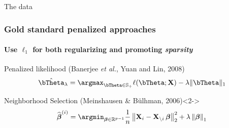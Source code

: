 \documentclass{beamer}\usepackage[]{graphicx}\usepackage[]{color}
\begin{document}
\begin{frame}
\begin{overlayarea}{\textwidth}{\textheight}
{\begin{beamerboxesrounded}[upper=sur:head,lower=sur:bloc,shadow=true]{The data}
      \end{beamerboxesrounded}
    }
  \end{overlayarea}      
\end{frame}

\begin{frame}
  \frametitle{Gold standard penalized approaches}
  \framesubtitle{Use $\ell_1$ for both regularizing and promoting \textit{sparsity}}

  \begin{overlayarea}{\textwidth}{\textheight}

  \begin{block}{Penalized likelihood (Banerjee \textit{et al.}, Yuan and Lin, 2008)}
    \vspace{-1em}
    \begin{equation*}
      \hat{\bTheta}_\lambda=\argmax_{\bTheta \in \mathbb{S}_+}
      \ell(\bTheta;\mathbf{X})-\lambda
      \|\bTheta\|_{1}
    \end{equation*}
  \end{block}
  \vspace*{-1em}


  \vfill

  \begin{block}{Neighborhood Selection (Meinshausen \& B\"ulhman, 2006)}<2->
    \vspace*{-1em}
    \begin{equation*}
      \widehat{\boldsymbol\beta}^{(i)} = \argmin_{\boldsymbol\beta \in \mathbb{R}^{p-1} }
      \frac{1}{n} \left\| \mathbf{X}_i - \mathbf{X}_{\backslash i} \,
        {\boldsymbol\beta} \right\|_2^2 + \lambda \left\| {\boldsymbol\beta} \right\|_{1}
    \end{equation*}
    \vspace*{-0.75\baselineskip}
  \end{block}
  

\end{overlayarea}
\end{frame}
\end{document}
